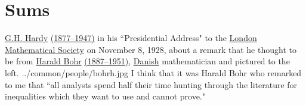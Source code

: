 ﻿%





\section{Sums}



\qboxnps
  { 
    \href{http://en.wikipedia.org/wiki/G.H._Hardy}{G.H. Hardy} 
    \href{http://www-history.mcs.st-andrews.ac.uk/Timelines/TimelineG.html}{(1877--1947)}
    in his ``Presidential Address" to the 
    \href{http://en.wikipedia.org/wiki/London_mathematical_society}{London Mathematical Society}
    on November 8, 1928, about a remark that he thought to be from 
    \href{http://en.wikipedia.org/wiki/Harald_Bohr}{Harald Bohr}
    \href{http://www-history.mcs.st-andrews.ac.uk/Timelines/TimelineG.html}{(1887--1951)}, 
    \href{http://www-history.mcs.st-andrews.ac.uk/Countries/Denmark.html}{Danish} 
    mathematician and pictured to the left.
     
    \footnotemark
  }
  {../common/people/bohrh.jpg}
  {I think that it was Harald Bohr who remarked to me that 
   ``all analysts spend half their time hunting through the literature 
   for inequalities which they want to use and cannot prove." }


